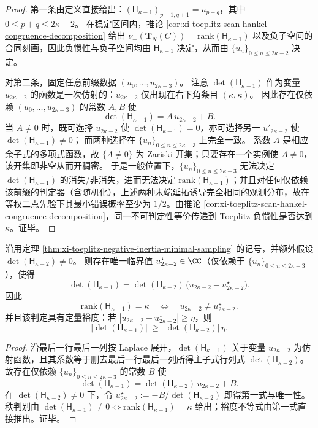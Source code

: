 \begin{proof}
第一条由定义直接给出：\((\mathsf H_{\kappa-1})_{p+1,q+1}=u_{p+q}\)，其中 \(0\le p+q\le 2\kappa-2\)。
在稳定区间内，推论 \ref{cor:xi-toeplitz-scan-hankel-congruence-decomposition} 给出
\(
\nu_-(\mathbf{T}_N(C))=\mathrm{rank}(\mathsf H_{\kappa-1})
\)
以及负子空间的合同刻画，因此负惯性与负子空间均由 \(\mathsf H_{\kappa-1}\) 决定，从而由 \(\{u_n\}_{0\le n\le 2\kappa-2}\) 决定。
\par
对第二条，固定任意前缀数据 \((u_0,\dots,u_{2\kappa-3})\)。
注意 \(\det(\mathsf H_{\kappa-1})\) 作为变量 \(u_{2\kappa-2}\) 的函数是一次仿射的：\(u_{2\kappa-2}\) 仅出现在右下角条目 \((\kappa,\kappa)\)。
因此存在仅依赖 \((u_0,\dots,u_{2\kappa-3})\) 的常数 \(A,B\) 使
\[
\det(\mathsf H_{\kappa-1})=A\,u_{2\kappa-2}+B.
\]
当 \(A\neq 0\) 时，既可选择 \(u_{2\kappa-2}\) 使 \(\det(\mathsf H_{\kappa-1})=0\)，亦可选择另一 \(u'_{2\kappa-2}\) 使 \(\det(\mathsf H_{\kappa-1})\neq 0\)；
而两种选择在 \(\{u_n\}_{0\le n\le 2\kappa-3}\) 上完全一致。
系数 \(A\) 是相应余子式的多项式函数，故 \(\{A\neq 0\}\) 为 Zariski 开集；只要存在一个实例使 \(A\neq 0\)，该开集即非空从而开稠密。
于是一般位置下，\(\{u_n\}_{0\le n\le 2\kappa-3}\) 无法决定 \(\det(\mathsf H_{\kappa-1})\) 的消失/非消失，进而无法决定 \(\mathrm{rank}(\mathsf H_{\kappa-1})\)；并且对任何仅依赖该前缀的判定器（含随机化），上述两种末端延拓诱导完全相同的观测分布，故在等权二点先验下其最小错误概率至少为 \(1/2\)。由推论 \ref{cor:xi-toeplitz-scan-hankel-congruence-decomposition}，同一不可判定性等价传递到 Toeplitz 负惯性是否达到 \(\kappa\)。证毕。
\end{proof}

\begin{proposition}\label{prop:xi-hankel-minimal-sampling-one-point-exception-robust}
沿用定理 \ref{thm:xi-toeplitz-negative-inertia-minimal-sampling} 的记号，并额外假设
\(\det(\mathsf H_{\kappa-2})\neq 0\)。
则存在唯一临界值 \(u_{2\kappa-2}^{\star}\in\CC\)（仅依赖于 \(\{u_n\}_{0\le n\le 2\kappa-3}\)），使得
\[
\det(\mathsf H_{\kappa-1})
=\det(\mathsf H_{\kappa-2})\,\bigl(u_{2\kappa-2}-u_{2\kappa-2}^{\star}\bigr).
\]
因此
\[
\mathrm{rank}(\mathsf H_{\kappa-1})=\kappa
\quad\Longleftrightarrow\quad
u_{2\kappa-2}\neq u_{2\kappa-2}^{\star}.
\]
并且该判定具有定量裕度：若 \(|u_{2\kappa-2}-u_{2\kappa-2}^{\star}|\ge \eta\)，则
\[
\bigl|\det(\mathsf H_{\kappa-1})\bigr|\ \ge\ \bigl|\det(\mathsf H_{\kappa-2})\bigr|\,\eta.
\]
\end{proposition}
\begin{proof}
沿最后一行最后一列按 Laplace 展开，\(\det(\mathsf H_{\kappa-1})\) 关于变量 \(u_{2\kappa-2}\) 为仿射函数，且其系数等于删去最后一行最后一列所得主子式行列式 \(\det(\mathsf H_{\kappa-2})\)。
故存在仅依赖 \(\{u_n\}_{0\le n\le 2\kappa-3}\) 的常数 \(B\) 使
\[
\det(\mathsf H_{\kappa-1})=\det(\mathsf H_{\kappa-2})\,u_{2\kappa-2}+B.
\]
在 \(\det(\mathsf H_{\kappa-2})\neq 0\) 下，令
\(
u_{2\kappa-2}^{\star}:=-B/\det(\mathsf H_{\kappa-2})
\)
即得第一式与唯一性。
秩判别由
\(
\det(\mathsf H_{\kappa-1})\neq 0\iff \mathrm{rank}(\mathsf H_{\kappa-1})=\kappa
\)
给出；裕度不等式由第一式直接推出。证毕。
\end{proof}


